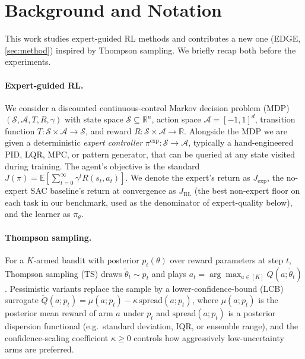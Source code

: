 \documentclass{article}
\begin{document}
\section{Background and Notation}
\label{sec:problem}

This work studies expert-guided RL methods and contributes a new one
(EDGE, \cref{sec:method}) inspired by Thompson sampling. We briefly
recap both before the experiments.

\paragraph{Expert-guided RL.}
We consider a discounted continuous-control Markov decision problem (MDP)
$(\mathcal{S}, \mathcal{A}, T, R, \gamma)$ with state space
$\mathcal{S} \subseteq \mathbb{R}^n$, action space
$\mathcal{A} = [-1,1]^d$, transition function $T: \mathcal{S} \times
\mathcal{A} \to \mathcal{S}$, and reward $R: \mathcal{S} \times
\mathcal{A} \to \mathbb{R}$. Alongside the MDP we are given a
deterministic \emph{expert controller} $\pi^{\mathrm{exp}} : \mathcal{S} \to
\mathcal{A}$, typically a hand-engineered PID, LQR, MPC, or pattern
generator, that can be queried at any state visited during training.
The agent's objective is the standard $J(\pi) = \mathbb{E}\left[
\sum_{t=0}^\infty \gamma^t R(s_t, a_t)\right]$. We denote the
expert's return as $J_{\mathrm{exp}}$, the no-expert SAC baseline's
return at convergence as $J_{\mathrm{RL}}$ (the best non-expert
floor on each task in our benchmark, used as the denominator of
expert-quality below), and the learner as $\pi_\theta$.

\paragraph{Thompson sampling.}
For a $K$-armed bandit with posterior $p_t(\theta)$ over reward
parameters at step $t$, Thompson sampling (TS)
\citep{russo2014ts,russo2018tutorial} draws $\tilde\theta_t \sim
p_t$ and plays $a_t = \arg\max_{a \in [K]} Q(a;\tilde\theta_t)$.
Pessimistic variants \citep{wu2016conservative,kazerouni2017conservative}
replace the sample by a lower-confidence-bound (LCB) surrogate
$\check Q(a; p_t) = \mu(a; p_t) - \kappa\,\mathrm{spread}(a; p_t)$,
where $\mu(a; p_t)$ is the posterior mean reward of arm $a$ under
$p_t$ and $\mathrm{spread}(a; p_t)$ is a posterior dispersion
functional (e.g.\ standard deviation, IQR, or ensemble range), and
the confidence-scaling coefficient $\kappa \geq 0$ controls how
aggressively low-uncertainty arms are preferred.
\end{document}
